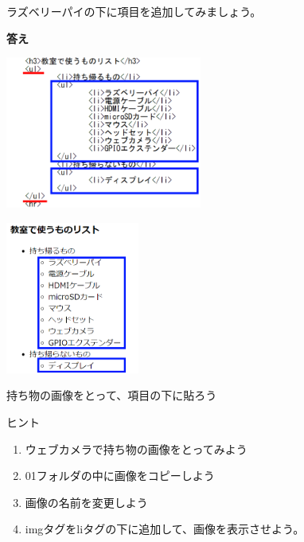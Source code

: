 \documentclass[a4paper,12pt]{jarticle}
\begin{document}
ラズベリーパイの下に項目を追加してみましょう。


\bigskip


\clearpage\flushleft
\textbf{答え}


\bigskip

\centering    
\begin{minipage}{0.45\linewidth}
  \includegraphics[width=\linewidth,height=5cm]{textbook-img1043.png}
\end{minipage}
\hfill
\vspace{20pt}
\begin{minipage}{0.45\linewidth}
  \includegraphics[width=\linewidth,height=5cm]{textbook-img1044.png}
\end{minipage}

\bigskip
\flushleft

\theQuestion\label{Q:hasAnswer04-11}

持ち物の画像をとって、項目の下に貼ろう

ヒント

\begin{enumerate}
  \item
        ウェブカメラで持ち物の画像をとってみよう
  \item
        01フォルダの中に画像をコピーしよう
  \item 画像の名前を変更しよう
  \item
        imgタグをliタグの下に追加して、画像を表示させよう。
\end{enumerate}

\bigskip


\clearpage
\end{document}
